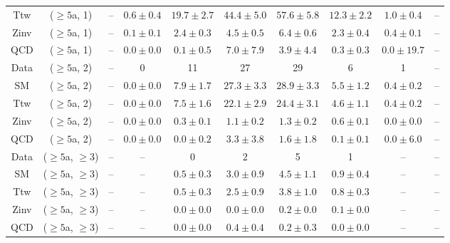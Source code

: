 \begin{table}[h!]
{\begin{tabular}{cccccccccc}
	Ttw & ($\ge5$a, 1) & -- & $0.6\pm 0.4$ & $19.7\pm 2.7$ & $44.4\pm 5.0$ & $57.6\pm 5.8$ & $12.3\pm 2.2$ & $1.0\pm 0.4$ & -- \\[0.5ex] 
	Zinv & ($\ge5$a, 1) & -- & $0.1\pm 0.1$ & $2.4\pm 0.3$ & $4.5\pm 0.5$ & $6.4\pm 0.6$ & $2.3\pm 0.4$ & $0.4\pm 0.1$ & -- \\[0.5ex] 
	QCD & ($\ge5$a, 1) & -- & $0.0\pm 0.0$ & $0.1\pm 0.5$ & $7.0\pm 7.9$ & $3.9\pm 4.4$ & $0.3\pm 0.3$ & $0.0\pm 19.7$ & -- \\[0.5ex] 
	Data & ($\ge5$a, 2) & -- & 0 & 11 & 27 & 29 & 6 & 1 & -- \\[0.5ex] 
	SM & ($\ge5$a, 2) & -- & $0.0\pm 0.0$ & $7.9\pm 1.7$ & $27.3\pm 3.3$ & $28.9\pm 3.3$ & $5.5\pm 1.2$ & $0.4\pm 0.2$ & -- \\[0.5ex] 
	Ttw & ($\ge5$a, 2) & -- & $0.0\pm 0.0$ & $7.5\pm 1.6$ & $22.1\pm 2.9$ & $24.4\pm 3.1$ & $4.6\pm 1.1$ & $0.4\pm 0.2$ & -- \\[0.5ex] 
	Zinv & ($\ge5$a, 2) & -- & $0.0\pm 0.0$ & $0.3\pm 0.1$ & $1.1\pm 0.2$ & $1.3\pm 0.2$ & $0.6\pm 0.1$ & $0.0\pm 0.0$ & -- \\[0.5ex] 
	QCD & ($\ge5$a, 2) & -- & $0.0\pm 0.0$ & $0.0\pm 0.2$ & $3.3\pm 3.8$ & $1.6\pm 1.8$ & $0.1\pm 0.1$ & $0.0\pm 6.0$ & -- \\[0.5ex] 
	Data & ($\ge5$a, $\ge3$) & -- & -- & 0 & 2 & 5 & 1 & -- & -- \\[0.5ex] 
	SM & ($\ge5$a, $\ge3$) & -- & -- & $0.5\pm 0.3$ & $3.0\pm 0.9$ & $4.5\pm 1.1$ & $0.9\pm 0.4$ & -- & -- \\[0.5ex] 
	Ttw & ($\ge5$a, $\ge3$) & -- & -- & $0.5\pm 0.3$ & $2.5\pm 0.9$ & $3.8\pm 1.0$ & $0.8\pm 0.3$ & -- & -- \\[0.5ex] 
	Zinv & ($\ge5$a, $\ge3$) & -- & -- & $0.0\pm 0.0$ & $0.0\pm 0.0$ & $0.2\pm 0.0$ & $0.1\pm 0.0$ & -- & -- \\[0.5ex] 
	QCD & ($\ge5$a, $\ge3$) & -- & -- & $0.0\pm 0.0$ & $0.4\pm 0.4$ & $0.2\pm 0.3$ & $0.0\pm 0.0$ & -- & -- \\[0.5ex] 
	\hline
	\hline
\end{tabular}}
\end{table}

